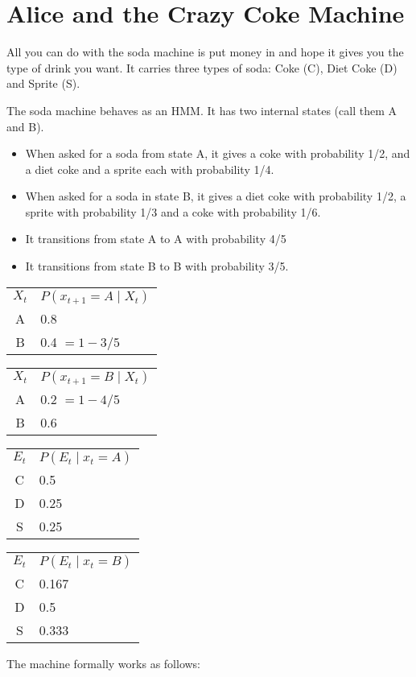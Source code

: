 \documentclass[fleqn]{hw8}
\begin{document}
\section{Alice and the Crazy Coke Machine}
\vspace{-0.5cm}
All you can do with the soda machine is put money in and hope it gives you the type of drink you want.  It carries three types of soda: 
Coke (C), Diet Coke (D) and Sprite (S).

The soda machine behaves as an HMM.  It has two internal states (call them A and B).  
\begin{itemize}
\item When asked for a soda from state A, it gives a coke with probability 1/2, and a diet coke and a sprite each with probability 1/4.
\item When asked for a soda in state B, it gives a diet coke with probability 1/2, a sprite with probability 1/3 and a coke with probability 1/6.
\item It transitions from state A to A with probability 4/5
\item It transitions from state B to B with probability 3/5. 
\end{itemize}

\begin{tabular}[t]{c|l}
	$X_{t}$ & $P(x_{t+1} = A \mid X_{t})$ \\ 
	\cline{1-2}
	A   & 0.8 \\
	B   & 0.4 $ = 1 - 3/5$
\end{tabular}
\quad
\begin{tabular}[t]{c|l}
	$X_{t}$ & $P(x_{t+1} = B \mid X_{t})$ \\ 
	\cline{1-2}
	A   & 0.2 $ = 1 - 4/5$\\
	B   & 0.6 
\end{tabular}
\quad
\begin{tabular}[t]{c|l}
	$E_{t}$ & $P(E_{t} \mid x_{t} = A)$ \\ 
	\cline{1-2}
	C   & 0.5 \\
	D   & 0.25 \\
	S   & 0.25 
\end{tabular}
\quad
\begin{tabular}[t]{c|l}
	$E_{t}$ & $P(E_{t} \mid x_{t} = B)$ \\ 
	\cline{1-2}
	C   & 0.167 \\
	D   & 0.5 \\
	S   & 0.333 
\end{tabular}

The machine formally works as follows:
\end{document}
